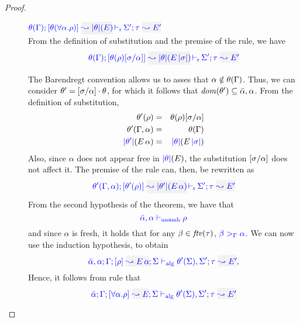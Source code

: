 \begin{proof}
\begin{description}
\item[]\quad
$\dmres{\theta(\tenv)}{\theta(\tall{\alpha}{\rulet})}{\etrans{\theta}(E)}{\type}{E'}{\Sigma'}$\ \\

From the definition of substitution and the premise of the rule, we have
\begin{equation*}
  \dmres{\theta(\tenv)}{\theta(\rulet)[\suty/\alpha]}{\etrans{\theta}(\mmapp{E}{\etrans{\suty}})}{\type}{E'}{\Sigma'}
\end{equation*}

The Barendregt convention allows us to asses that $\alpha\notin\theta(\Gamma)$. Thus, we can
consider $\theta'=[\sigma/\alpha]\cdot\theta$, for which it follows that
${\it dom }{(\theta')}\subseteq\bar\alpha,\alpha$. From the definition of substitution,
\begin{eqnarray*}
  \theta'(\rho) & = & \theta(\rho)[\sigma/\alpha]\\
  \theta'(\Gamma,\alpha) & = & \theta(\Gamma)\\
  {\color{blue} |\theta'|}(E\,\alpha) & = & {\color{blue} |\theta|}(E\,{\color{blue} |\sigma|})
\end{eqnarray*}
Also, since $\alpha$ does not appear free in ${\color{blue} |\theta|}(E)$, the substitution
$[\sigma/\alpha]$ does not affect it.
The premise of the rule can, then, be rewritten as
\begin{equation*}
  \dmres{\theta'(\tenv,\alpha)}{\theta'(\rulet)}{\etrans{\theta'}(\mmapp{E}{\alpha})}{\type}{E'}{\Sigma'}
\end{equation*}
From the second hypothesis of the theorem, we have that
\begin{equation*}
  {\color{blue} \bar\alpha,\alpha \vdash_{\mathrm{unamb}}\rho}
\end{equation*}
and since $\alpha$ is fresh, it holds that for any $\beta\in{\it ftv }(\tau)$,
${\color{blue} \beta >_{\Gamma} \alpha}$. We can now use the induction hypothesis, to obtain
\begin{equation*}
  \admres{\bar\alpha,\alpha}{\tenv}{\rulet}{\mmapp{E}{\alpha}}{\Sigma}{\type}{E'}{\theta'(\Sigma),\Sigma'}
,\end{equation*}
Hence, it follows from rule  that
\begin{equation*}
\admres{\bar\alpha}{\tenv}{\tall{\alpha}{\rulet}}{E}{\Sigma}{\type}{E'}{\theta'(\Sigma),\Sigma'}
\end{equation*}
\end{description}
\end{proof}

